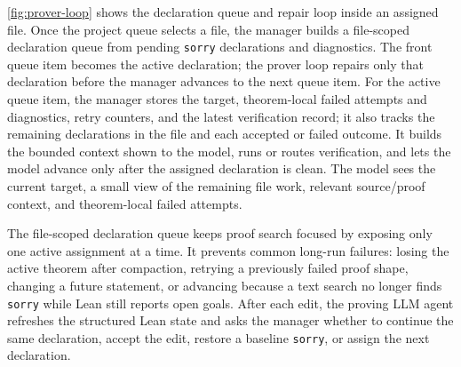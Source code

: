 \documentclass{article}
\newcommand{\lean}{Lean\xspace}
\begin{document}
\cref{fig:prover-loop} shows the declaration queue and repair loop inside an assigned file.
Once the project queue selects a file, the manager builds a file-scoped declaration queue from pending \texttt{sorry} declarations and diagnostics.
The front queue item becomes the active declaration; the prover loop repairs only that declaration before the manager advances to the next queue item.
For the active queue item, the manager stores the target, theorem-local failed attempts and diagnostics, retry counters, and the latest verification record; it also tracks the remaining declarations in the file and each accepted or failed outcome.
It builds the bounded context shown to the model, runs or routes verification, and lets the model advance only after the assigned declaration is clean.
The model sees the current target, a small view of the remaining file work, relevant source/proof context, and theorem-local failed attempts.

The file-scoped declaration queue keeps proof search focused by exposing only one active assignment at a time.
It prevents common long-run failures: losing the active theorem after compaction, retrying a previously failed proof shape, changing a future statement, or advancing because a text search no longer finds \texttt{sorry} while \lean still reports open goals.
After each edit, the proving LLM agent refreshes the structured \lean state and asks the manager whether to continue the same declaration, accept the edit, restore a baseline \texttt{sorry}, or assign the next declaration.
\end{document}
